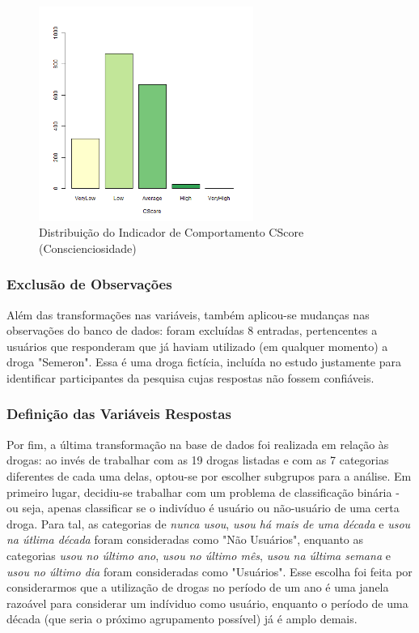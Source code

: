 \documentclass[
	article,			%
	11pt,				%
	oneside,			%
	a4paper,			%
	english,			%
	brazil,				%
	sumario=tradicional
	]{abntex2}
\begin{document}
\begin{figure}[H]
    \centering
    \includegraphics[width=7cm]{figuras/dist_cscore.png}
    \caption{Distribuição do Indicador de Comportamento CScore (Conscienciosidade)}
    \label{comp3}
\end{figure}

\subsubsection{Exclusão de Observações}
Além das transformações nas variáveis, também aplicou-se mudanças nas observações do banco de dados: foram excluídas 8 entradas, pertencentes a usuários que responderam que já haviam utilizado (em qualquer momento) a droga "Semeron". Essa é uma droga fictícia, incluída no estudo justamente para identificar participantes da pesquisa cujas respostas não fossem confiáveis.

\subsubsection{Definição das Variáveis Respostas}
Por fim, a última transformação na base de dados foi realizada em relação às drogas: ao invés de trabalhar com as 19 drogas listadas e com as 7 categorias diferentes de cada uma delas, optou-se por escolher subgrupos para a análise. Em primeiro lugar, decidiu-se trabalhar com um problema de classificação binária - ou seja, apenas classificar se o indivíduo é usuário ou não-usuário de uma certa droga. Para tal, as categorias de \textit{nunca usou}, \textit{usou há mais de uma década} e \textit{usou na útlima década} foram consideradas como "Não Usuários", enquanto as categorias \textit{usou no último ano}, \textit{usou no último mês}, \textit{usou na última semana} e \textit{usou no último dia} foram consideradas como "Usuários". Esse escolha foi feita por considerarmos que a utilização de drogas no período de um ano é uma janela razoável para considerar um indíviduo como usuário, enquanto o período de uma década (que seria o próximo agrupamento possível) já é amplo demais.
\end{document}
